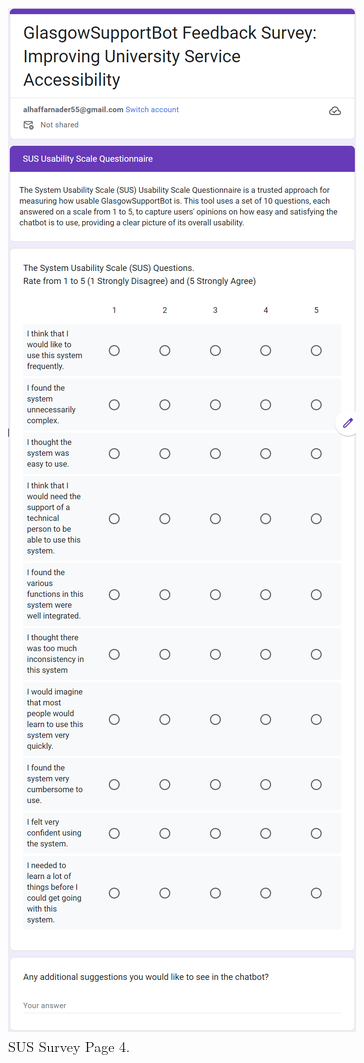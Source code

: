 \documentclass{l4proj}
\begin{document}
\begin{appendices}
\begin{figure}[h!]
  \centering
  \begin{adjustbox}{center,max height=0.77\textheight, max width=\linewidth}
    \includegraphics{images/survey4.png}
  \end{adjustbox}
  \caption{SUS Survey Page 4.}
  \label{fig: Survey Page 4}
\end{figure}


\end{appendices}
\end{document}
